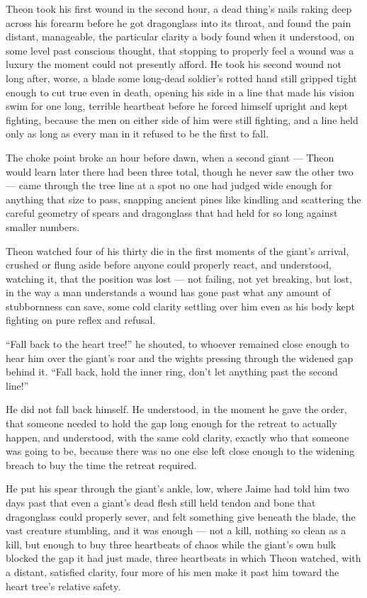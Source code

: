 Theon took his first wound in the second hour, a dead thing’s nails raking deep across his forearm before he got dragonglass into its throat, and found the pain distant, manageable, the particular clarity a body found when it understood, on some level past conscious thought, that stopping to properly feel a wound was a luxury the moment could not presently afford. He took his second wound not long after, worse, a blade some long-dead soldier’s rotted hand still gripped tight enough to cut true even in death, opening his side in a line that made his vision swim for one long, terrible heartbeat before he forced himself upright and kept fighting, because the men on either side of him were still fighting, and a line held only as long as every man in it refused to be the first to fall.

\sceneBreak

The choke point broke an hour before dawn, when a second giant — Theon would learn later there had been three total, though he never saw the other two — came through the tree line at a spot no one had judged wide enough for anything that size to pass, snapping ancient pines like kindling and scattering the careful geometry of spears and dragonglass that had held for so long against smaller numbers.

Theon watched four of his thirty die in the first moments of the giant’s arrival, crushed or flung aside before anyone could properly react, and understood, watching it, that the position was lost — not failing, not yet breaking, but lost, in the way a man understands a wound has gone past what any amount of stubbornness can save, some cold clarity settling over him even as his body kept fighting on pure reflex and refusal.

“Fall back to the heart tree!” he shouted, to whoever remained close enough to hear him over the giant’s roar and the wights pressing through the widened gap behind it. “Fall back, hold the inner ring, don’t let anything past the second line!”

He did not fall back himself. He understood, in the moment he gave the order, that someone needed to hold the gap long enough for the retreat to actually happen, and understood, with the same cold clarity, exactly who that someone was going to be, because there was no one else left close enough to the widening breach to buy the time the retreat required.

He put his spear through the giant’s ankle, low, where Jaime had told him two days past that even a giant’s dead flesh still held tendon and bone that dragonglass could properly sever, and felt something give beneath the blade, the vast creature stumbling, and it was enough — not a kill, nothing so clean as a kill, but enough to buy three heartbeats of chaos while the giant’s own bulk blocked the gap it had just made, three heartbeats in which Theon watched, with a distant, satisfied clarity, four more of his men make it past him toward the heart tree’s relative safety.

